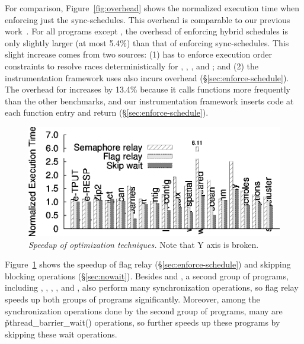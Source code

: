 For comparison, Figure~\ref{fig:overhead} shows the normalized
execution time when enforcing just the sync-schedules.  This overhead is
comparable to our previous work~\cite{cui:tern:osdi10}.  For all
programs except \watern, the overhead of enforcing hybrid schedules is only slightly
larger (at most 5.4\%) than that of enforcing sync-schedules.
This slight increase comes from two sources: (1) \peregrine has to enforce
execution order constraints to resolve races deterministically for \pbzip,
 \barnes, \fft, and \lun; and (2) the instrumentation framework \peregrine uses
also incurs overhead (\S\ref{sec:enforce-schedule}). 
The overhead for \watern increases by 13.4\% because it calls functions
more frequently than the other benchmarks, and our instrumentation framework
inserts code at each function entry and return
(\S\ref{sec:enforce-schedule}).




\begin{figure}[b!]
\centering
\includegraphics[width=\columnwidth]{peregrine/figures/opt.eps}
\vspace{-.3in}
\caption{{\em Speedup of optimization techniques.} Note that Y axis is
  broken.} \label{fig:opt}
\end{figure}

Figure~\ref{fig:opt} shows the speedup of flag relay
(\S\ref{sec:enforce-schedule}) and skipping blocking operations
(\S\ref{sec:nowait}).  Besides \watern and \cholesky, a
second group of programs, including \barnes, \lun, \radix, \waters, and
\ocean, also perform many synchronization operations, so flag relay speeds up
both groups of programs significantly.  Moreover, among the
synchronization operations done by the second group of programs, many are
\v{pthread\_barrier\_wait()} operations, so \peregrine further speeds up these
programs by skipping these wait operations.

